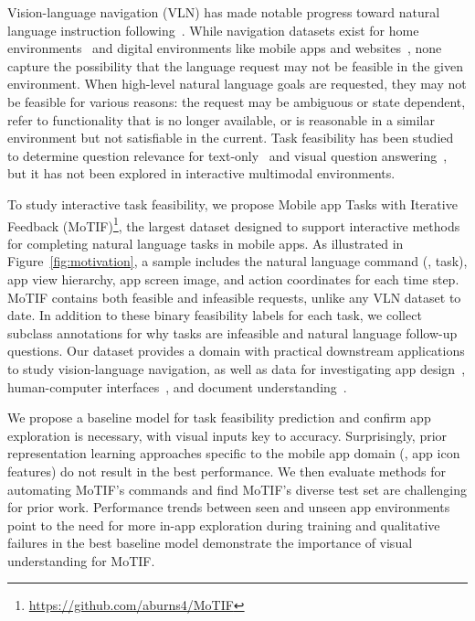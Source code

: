 Vision-language navigation (VLN) has made notable progress toward natural language instruction following~\cite{blukis2021persistent,irshad2021hierarchical,min2021film,nguyen2019hanna,ALFRED20,singh2020moca,vln_ssa}. While navigation datasets exist for home environments~\cite{vln,embodiedqa,ku-etal-2020-room,ALFRED20} and digital environments like mobile apps and websites~\cite{li-etal-2020-mapping,vut,langtoelem,wob}, none capture the possibility that the language request may not be feasible in the given environment. When high-level natural language goals are requested, they may not be feasible for various reasons: the request may be ambiguous or state dependent, refer to functionality that is no longer available, or is reasonable in a similar environment but not satisfiable in the current. Task feasibility has been studied to determine question relevance for text-only~\cite{Gardner2020DeterminingQP} and visual question answering~\cite{vizwiz,massiceti,ray2016question}, but it has not been explored in interactive multimodal environments.

To study interactive task feasibility, we propose Mobile app Tasks with Iterative Feedback (MoTIF)\footnote{\url{https://github.com/aburns4/MoTIF}}, the largest dataset designed to support interactive methods for completing natural language tasks in mobile apps. As illustrated in Figure~\ref{fig:motivation}, a sample includes the natural language command (\ie, task), app view hierarchy, app screen image, and action coordinates for each time step. MoTIF contains both feasible and infeasible requests, unlike any VLN dataset to date. 
In addition to these binary feasibility labels for each task, we collect subclass annotations for why tasks are infeasible and natural language follow-up questions. 
Our dataset provides a domain with practical downstream applications to study vision-language navigation, as well as data for investigating app design~\cite{rico,erica,designsemantics}, human-computer interfaces~\cite{sugilite,convobreak,demoplusLi2021}, and document understanding~\cite{appalaraju2021docformer,Li_2021_CVPR,canvasvae}. 

We propose a baseline model for task feasibility prediction and confirm app exploration is necessary, with visual inputs key to accuracy. Surprisingly, prior representation learning approaches specific to the mobile app domain (\eg, app icon features) do not result in the best performance. 
We then evaluate methods for automating MoTIF's commands and find MoTIF's diverse test set are challenging for prior work. Performance trends between seen and unseen app environments point to the need for more in-app exploration during training and qualitative failures in the best baseline model demonstrate the importance of visual understanding for MoTIF.

